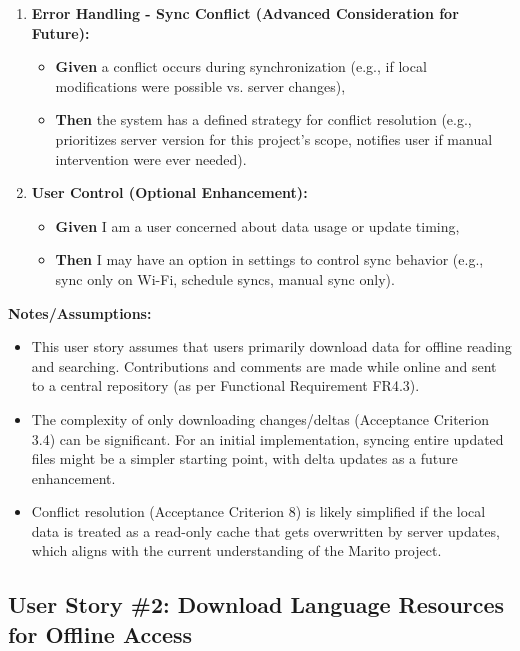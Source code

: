 \documentclass[12pt]{article}
\begin{document}
\begin{enumerate}
    \item \textbf{Error Handling - Sync Conflict (Advanced Consideration for Future):}
    \begin{itemize}
        \item \textbf{Given} a conflict occurs during synchronization (e.g., if local modifications were possible vs. server changes),
        \item \textbf{Then} the system has a defined strategy for conflict resolution (e.g., prioritizes server version for this project's scope, notifies user if manual intervention were ever needed).
    \end{itemize}

    \item \textbf{User Control (Optional Enhancement):}
    \begin{itemize}
        \item \textbf{Given} I am a user concerned about data usage or update timing,
        \item \textbf{Then} I may have an option in settings to control sync behavior (e.g., sync only on Wi-Fi, schedule syncs, manual sync only).
    \end{itemize}
\end{enumerate}

\vspace{1em}
\textbf{Notes/Assumptions:}
\begin{itemize}
    \item This user story assumes that users primarily download data for offline reading and searching. Contributions and comments are made while online and sent to a central repository (as per Functional Requirement FR4.3).
    \item The complexity of only downloading changes/deltas (Acceptance Criterion 3.4) can be significant. For an initial implementation, syncing entire updated files might be a simpler starting point, with delta updates as a future enhancement.
    \item Conflict resolution (Acceptance Criterion 8) is likely simplified if the local data is treated as a read-only cache that gets overwritten by server updates, which aligns with the current understanding of the Marito project.
\end{itemize}



\subsection{User Story \#2: Download Language Resources for Offline Access}
\end{document}
